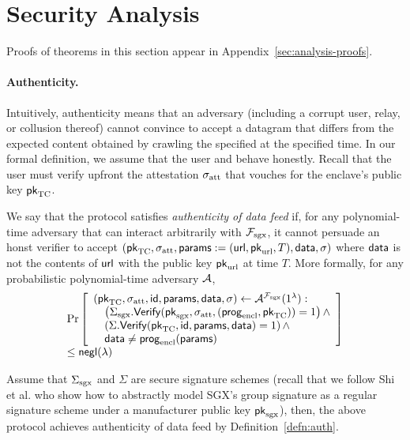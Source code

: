 \section{Security Analysis}
\label{sec:analysis}

Proofs of theorems in this section appear in Appendix~\ref{sec:analysis-proofs}.


\paragraph{Authenticity.}
Intuitively, authenticity means that an adversary (including a corrupt user, relay, or collusion thereof)
cannot convince \tcont to accept a datagram that differs from the expected content obtained by crawling the specified \weburl at the specified time.
In our formal definition, we assume that the user and \tcont behave honestly.
Recall that the user must verify upfront the attestation ${\sigma_{\textrm{att}}}$ that vouches for the enclave's public key ${\sf pk}_{\textrm{TC}}$.

\begin{definition}
We say that the \tc protocol satisfies \emph{authenticity of data feed} if,
for any polynomial-time adversary that can interact arbitrarily with $\mathcal{F}_{\textrm{sgx}}$,
it cannot persuade an honst verifier to accept $({\sf pk}_{\textrm{TC}}, {\sigma_{\textrm{att}}}, {\sf params}:=({{\sf url}}, {\sf pk}_{\textrm{url}}, T), {\sf data}, \sigma)$
where ${\sf data}$ is not the contents of ${{\sf url}}$ with the public key ${\sf pk}_{\textrm{url}}$ at time $T$.
More formally, for any probabilistic polynomial-time adversary $\mathcal{A}$,
\[
\begin{array}{l}
\Pr\left[
\begin{array}{l}
({\sf pk}_{\textrm{TC}}, {\sigma_{\textrm{att}}}, {\sf id}, {\sf params}, {\sf data}, \sigma) \leftarrow 
\mathcal{A}^{\mathcal{F}_{\textrm{sgx}}}(1^\lambda) :\\
\quad \left({\Sigma_{\textrm{sgx}}}.{\sf Verify}({\sf pk}_{\mathrm{sgx}}, {\sigma_{\textrm{att}}}, ({\sf prog}_{\textrm{encl}}, {\sf pk}_{\textrm{TC}})) = 1\right) \wedge \\
\quad \left(\Sigma.{\sf Verify}({\sf pk}_{\textrm{TC}}, {\sf id}, {\sf params}, {\sf data})  = 1\right) \wedge\\
\quad {\sf data} \neq {\sf prog}_{\textrm{encl}}({\sf params}) 
\end{array}
\right] \\[3pt] 
\leq {\sf negl}(\lambda)
\end{array}
\]
\label{defn:auth}
\end{definition}


\begin{theorem}[Authenticity]
\label{thm:authenticity}
Assume that ${\Sigma_{\textrm{sgx}}}$
and $\Sigma$ are secure signature schemes (recall
that we follow Shi et al.  who show
how to abstractly  
model SGX's group signature as a regular signature
scheme under a manufacturer public key ${\sf pk}_{\mathrm{sgx}}$),
then, the above 
protocol achieves authenticity of data feed by Definition~\ref{defn:auth}.
\end{theorem}




